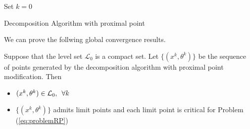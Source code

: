 \begin{algorithm}[ht]
 Set $k = 0$\\
 \caption{Decomposition Algorithm with proximal point}
\end{algorithm}
We can prove the follwing global convergence results.
\begin{proposition}
Suppose that the level set $\mathcal{L}_0$ is a compact set. Let $\{(x^k, \theta^k)\}$ be the sequence of points generated by the decomposition algorithm with proximal point modification. Then
\begin{itemize}
\item $(x^k, \theta^k) \in \mathcal{L}_0, \enskip \forall k$ 
\item  $\{(x^k, \theta^k)\}$ admits limit points and each limit point is critical for Problem (\ref{eq:problemRP})
\end{itemize}
\end{proposition}
